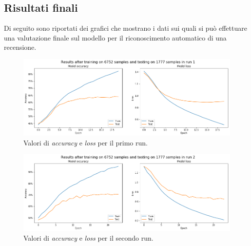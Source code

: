 \documentclass[12pt]{article}
\begin{document}
\subsection{Risultati finali}
Di seguito sono riportati dei grafici che mostrano i dati sui quali si può effettuare una valutazione finale sul modello per il riconoscimento automatico di una recensione.
\begin{figure}[H]
\centering
\includegraphics[width=\textwidth]{images/accuracy_loss_run1.png}
\caption{Valori di \textit{accuracy} e \textit{loss} per il primo run.}
\end{figure}
\begin{figure}[H]
\centering
\includegraphics[width=\textwidth]{images/accuracy_loss_run2.png}
\caption{Valori di \textit{accuracy} e \textit{loss} per il secondo run.}
\end{figure}
\end{document}
